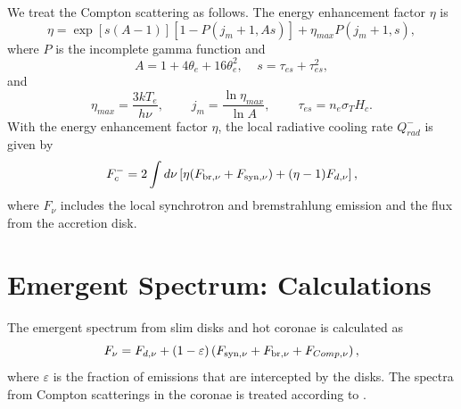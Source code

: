 \documentclass[oneside]{book}
\begin{document}
We treat the Compton scattering as follows.
The energy enhancement factor $\eta$ is
\begin{equation}
 \eta=\exp[s(A-1)][1-P(j_m+1,As)]+\eta_{max}P(j_m+1,s),
\end{equation}
where $P$ is the incomplete gamma function and
\begin{equation}
 A=1+4\theta_e+16\theta_e^2,~~~~~s=\tau_{es}+\tau_{es}^2,
\end{equation}
and
\begin{equation}
 \eta_{max}=\frac{3kT_e}{h\nu},~~~~~~~~~~j_m=\frac{\ln\eta_{max}}{\ln A},
~~~~~~~~~~\tau_{es}=n_e\sigma_TH_c.
\end{equation}
With the energy enhancement factor $\eta$, the local radiative cooling rate $Q_{rad}^{-}$ is given by
\begin{equation}
F_{c}^{-}=2\int d\nu \left[\eta (F_{\rm br, \nu} + F_{\rm syn, \nu}) + (\eta-1) F_{d, \nu}\right],
\end{equation}
where $F_\nu$ includes the local synchrotron and bremstrahlung emission and the flux from the accretion disk.
\section{Emergent Spectrum: Calculations}
The emergent spectrum from slim disks and hot coronae is calculated as
\begin{equation}
F_\nu=F_{d,\nu} +(1-\varepsilon) \left(F_{\rm syn, \nu} + F_{\rm br, \nu} + F_{Comp, \nu}\right),
\end{equation}
where $\varepsilon$ is the fraction of emissions that are intercepted by the disks. 
The spectra from Compton scatterings in the coronae is treated according to \cite{Coppi1990}.
\end{document}
